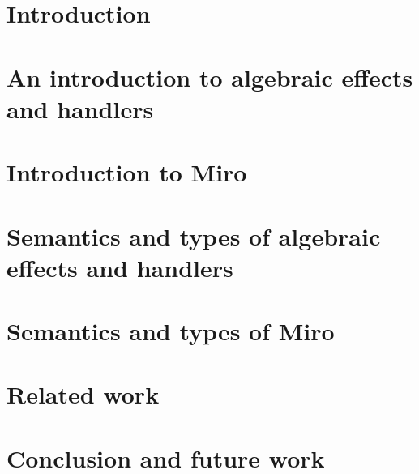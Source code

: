 \documentclass[twoside,a4paper,11pt]{memoir}
\newcommand{\lang}{Miro}
\begin{document}
\frontmatter
\thispagestyle{empty}
\maketitle
\makeformaltitlepages{}


\tableofcontents



\chapter{Introduction}


\chapter[Algebraic effects introduction]{An introduction to algebraic effects and handlers}


\chapter{Introduction to \lang{}}


\chapter[Algebraic effects theory]{Semantics and types of algebraic effects and handlers}


\chapter{Semantics and types of \lang{}}


\chapter{Related work}


\chapter{Conclusion and future work}

% 

\newpage

\printbibliography{}
\end{document}

